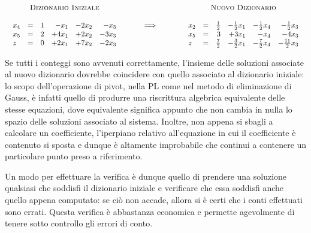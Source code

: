 \documentclass{article}
\begin{document}
	\[
		\begin{array}{c}
			\mbox{\sc Dizionario Iniziale}\\ \\
			\begin{array}{lcrrrr}
			x_{4} &=& 1 & -x_1 & -2x_2 & -x_3 \\
			x_{5} &=& 2 & +4x_1 & +2x_2 & -3x_3 \\
			z    &=& 0 & +2x_1 & +7x_2 & -2x_3 \\
			\end{array}\\
		\end{array}
		\hfill
		\hspace{1cm}
		{\Huge \Longrightarrow}
		\hfill
		\hspace{1.2cm}
		\begin{array}{c}
			\mbox{\sc Nuovo Dizionario}\\ \\
			\begin{array}{lcrrrr}
				x_{2} &=& \frac{1}{2} & -\frac{1}{2}x_1 & -\frac{1}{2}x_4 & -\frac{1}{2}x_3 \\
				x_{5} &=& 3 & +3x_1 & -x_4 & -4x_3 \\
				z    &=& \frac{7}{2} & -\frac{3}{2}x_1 & -\frac{7}{2}x_4 & -\frac{11}{2}x_3 \\
			\end{array}\\	
		\end{array}
	\]
	
  	Se tutti i conteggi sono avvenuti correttamente, l'insieme delle soluzioni associate al nuovo dizionario dovrebbe coincidere con quello associato al dizionario iniziale: lo scopo dell'operazione di pivot, nella PL come nel metodo di eliminazione di Gauss, \`e infatti quello di produrre una riscrittura algebrica equivalente delle stesse equazioni, dove equivalente significa appunto che non cambia in nulla lo spazio delle soluzioni associato al sistema.
    Inoltre, non appena si sbagli a calcolare un coefficiente, l'iperpiano relativo all'equazione in cui il coefficiente è contenuto si sposta e dunque è altamente improbabile che continui a contenere un particolare punto preso a riferimento. 

  	Un modo per effettuare la verifica è dunque quello di prendere una soluzione qualsiasi che soddisfi il dizionario iniziale e verificare che essa soddisfi anche quello appena computato: se ciò non accade, allora si è certi che i conti effettuati sono errati. Questa verifica è abbastanza economica e permette agevolmente di tenere sotto controllo gli errori di conto.
  	
\end{document}
